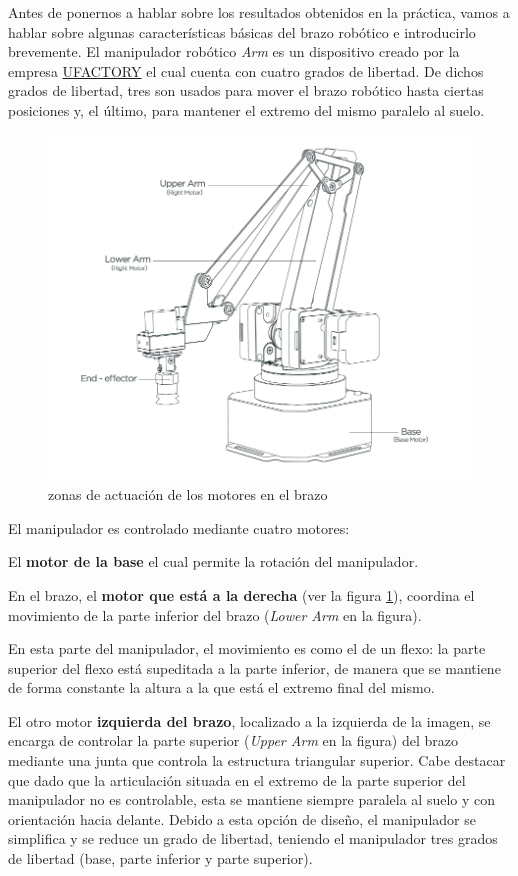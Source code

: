 \documentclass[a4paper,12pt]{article}
\begin{document}
Antes de ponernos a hablar sobre los resultados obtenidos en la práctica,
vamos a hablar sobre algunas características básicas del brazo robótico e
introducirlo brevemente.
El manipulador robótico \emph{{\textmu}Arm} es un dispositivo creado por la empresa
\href{https://www.ufactory.cc/#/}{UFACTORY} el cual cuenta con cuatro grados de libertad.
De dichos grados de libertad, tres son usados para mover el brazo robótico hasta ciertas
posiciones y, el último, para mantener el extremo del mismo paralelo al suelo.

\begin{figure}
    \begin{center}
        \includegraphics[width=.4\textwidth]{images/motors.png}
        \caption{zonas de actuación de los motores en el brazo \cite{noauthor_uarm_2019-1}}
        \label{fig:motors}
    \end{center}
\end{figure}

El manipulador es controlado mediante cuatro motores:

El \textbf{motor de la base} el cual permite la rotación del manipulador.

En el brazo, el \textbf{motor que está a la derecha} (ver la figura \ref{fig:motors}),
coordina el movimiento de la parte inferior del brazo (\textit{Lower Arm} en la figura).

En esta parte del manipulador, el movimiento es como el de un flexo: la parte superior
del flexo está supeditada a la parte inferior, de manera que se mantiene de forma
constante la altura a la que está el extremo final del mismo.

El otro motor \textbf{izquierda del brazo}, localizado a la izquierda de la imagen,
se encarga de controlar la parte superior (\textit{Upper Arm} en la figura)
del brazo mediante una junta que controla la estructura triangular superior. 
Cabe destacar que dado que la articulación situada en el extremo de la parte 
superior del manipulador no es controlable, esta se mantiene siempre paralela al suelo 
y con orientación hacia delante. Debido a esta opción de diseño, el manipulador se 
simplifica y se reduce un grado de libertad, teniendo el manipulador tres grados de libertad 
(base, parte inferior y parte superior).
\end{document}
